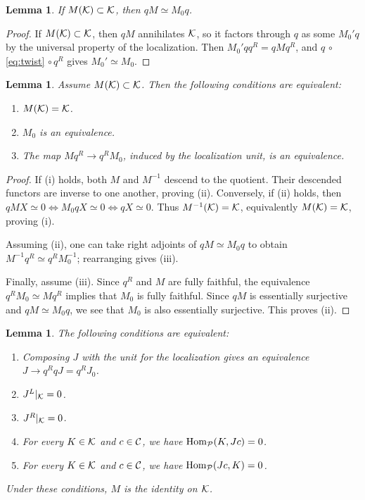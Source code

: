 \documentclass[12pt, letter]{amsart}
\newtheorem{lemma}[dummy]{Lemma}
\theoremstyle{definition}
\begin{document}
\begin{lemma} 
    If \(M(\mathcal{K})\subset\mathcal{K}\), then 
$qM \simeq M_0 q$. 
\end{lemma}
\begin{proof}
If \(M(\mathcal{K})\subset\mathcal{K}\), then  \(qM\) annihilates \(\mathcal{K}\), so it factors through \(q\) as some $M_0' q$ by
the universal property of the localization.  Then $M_0' qq^R = q M q^R$, and $q \, \circ$ \eqref{eq:twist} $\circ \, q^R$ gives $M_0' \simeq M_0$. 
\end{proof}

\begin{lemma}\label{lem:formal-descent}
Assume $M(\mathcal{K}) \subset \mathcal{K}$. Then
 the following conditions are equivalent:
\begin{enumerate}[label=\textup{(\roman*)}]
\item \(M(\mathcal{K})=\mathcal{K}\).
\item \(M_0\) is an equivalence.
\item The map  \(M q^R\to q^R M_0\), induced by the
localization unit, is an equivalence.
\end{enumerate}
\end{lemma}

\begin{proof}



If (i) holds, both \(M\) and \(M^{-1}\) descend to the quotient.
Their descended functors are inverse to one another, proving (ii).
Conversely, if (ii) holds, then
$
  qMX\simeq0
  \Longleftrightarrow
  M_0 q X\simeq0
  \Longleftrightarrow
  qX\simeq0.
$
Thus \(M^{-1}(\mathcal{K})=\mathcal{K}\), equivalently \(M(\mathcal{K})=\mathcal{K}\), proving (i). 

Assuming (ii), 
one can take right adjoints of
\(qM\simeq M_0 q\) to obtain
\(M^{-1} q^R\simeq q^R M_0^{-1}\); rearranging gives  (iii). 

Finally, assume (iii). Since \(q^R\) and \(M\) are fully faithful, the
equivalence \(q^R M_0 \simeq Mq^R\) implies that \(M_0\)
is fully faithful. Since \(qM\) is
essentially surjective and \(qM\simeq M_0 q\), we see that $M_0$ is also essentially surjective.  This proves  (ii).
\end{proof}





\begin{lemma}\label{lem:local} 
The following conditions are equivalent:
\begin{enumerate}[label=\textup{(\roman*)}]
\item Composing $J$ with the unit for the localization gives an equivalence  \(J\to q^R qJ = q^R J_0\).
\item \(J^L|_{\mathcal{K}}=0\).
\item \(J^R|_{\mathcal{K}}=0\).
\item For every $K \in \mathcal{K}$ and $c \in \mathcal{C}$, we have $\operatorname{Hom}_{\mathcal{P}}(K, Jc) = 0$. 
\item For every $K \in \mathcal{K}$ and $c \in \mathcal{C}$, we have $\operatorname{Hom}_{\mathcal{P}}(Jc, K) = 0$. 
\end{enumerate}
Under these conditions, $M$ is the identity on $\mathcal{K}$. 
\end{lemma}
\end{document}
